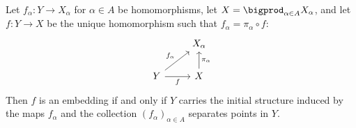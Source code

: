 \documentclass[article, a4paper, 11pt, oneside]{memoir}
\numberwithin{equation}{chapter}
\begin{document}
\begin{proposition}
    Let $f_\alpha \colon Y \to X_\alpha$ for $\alpha \in A$ be homomorphisms, let $X = \bigprod_{\alpha \in A} X_\alpha$, and let $f \colon Y \to X$ be the unique homomorphism such that $f_\alpha = \pi_\alpha \circ f$:
    \begin{equation*}
        \begin{tikzcd}
            & X_\alpha \\
            Y
                \ar[r, "f", swap]
                \ar[ru, "f_\alpha"]
            & X
                \ar[u, "\pi_\alpha", swap]
        \end{tikzcd}
    \end{equation*}
    Then $f$ is an embedding if and only if $Y$ carries the initial structure induced by the maps $f_\alpha$ and the collection $(f_\alpha)_{\alpha \in A}$ separates points in $Y$.
\end{proposition}
\end{document}
